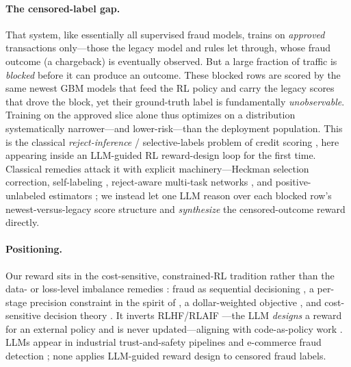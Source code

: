 \documentclass[11pt]{article}
\begin{document}
\paragraph{The censored-label gap.}
That system, like essentially all supervised fraud models, trains on \emph{approved}
transactions only---those the legacy model and rules let through, whose fraud outcome (a
chargeback) is eventually observed. But a large fraction of traffic is \emph{blocked} before
it can produce an outcome. These blocked rows are scored by the same newest GBM models that
feed the RL policy and carry the legacy scores that drove the block, yet their ground-truth
label is fundamentally \emph{unobservable}. Training on the approved slice alone thus
optimizes on a distribution systematically narrower---and lower-risk---than the deployment
population. This is the classical \emph{reject-inference} / selective-labels problem of
credit scoring \cite{heckman1979sample,lakkaraju2017selective,ehrhardt2021reject}, here
appearing inside an LLM-guided RL reward-design loop for the first time. Classical remedies
attack it with explicit machinery---Heckman selection correction, self-labeling
\cite{kozodoi2020shallow}, reject-aware multi-task networks \cite{liu2022rmt}, and
positive-unlabeled estimators \cite{elkan2008learning,duplessis2015convex,bekker2020learning};
we instead let one LLM reason over each blocked row's newest-versus-legacy score structure and
\emph{synthesize} the censored-outcome reward directly.

\paragraph{Positioning.}
Our reward sits in the cost-sensitive, constrained-RL tradition rather than the data- or
loss-level imbalance remedies \cite{chawla2002smote,lin2017focal}: fraud as sequential decisioning
\cite{shen2020deep,vimal2021application,qayoom2024novel,henderson2023irs}, a per-stage precision
constraint in the spirit of \citet{tessler2019rcpo}, a dollar-weighted objective
\cite{dervovic2023vdr}, and cost-sensitive decision theory
\cite{elkan2001foundations,bahnsen2015edcst,hoppner2022idcs,verbraken2013emp,cotter2019nondiff}.
It inverts RLHF/RLAIF \cite{ouyang2022instructgpt,bai2022constitutional,lee2024rlaif}---the LLM
\emph{designs} a reward for an external policy and is never updated---aligning with code-as-policy
work \cite{liang2023cap,wang2023voyager}. LLMs appear in industrial trust-and-safety pipelines
\cite{qiao2024scaling,chakraborty2024detoxbench,yang2025flag,fan2025enhancing,kath2025llm} and
e-commerce fraud detection \cite{rodrigues2022fraud,mutemi2024ecommerce}; none applies LLM-guided
reward design to censored fraud labels.
\end{document}
